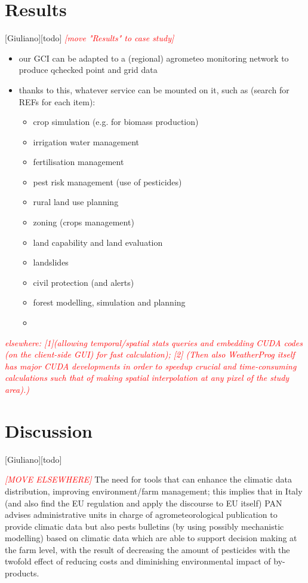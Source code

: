 \documentclass[authoryear,preprint,review,12pt]{elsarticle}
\newcommand{\note}[1]{\emph{\textcolor{red}{#1}}}
\begin{document}
\section{Results}[Giuliano][todo]
\note{[move "Results" to case study]}
\begin{itemize}
    \item our GCI can be adapted to a (regional) agrometeo monitoring network to produce qchecked point and grid data
    \item thanks to this, whatever service can be mounted on it, such as (search for REFs for each item):
    \begin{itemize}
        \item crop simulation (e.g. for biomass production)
        \item irrigation water management
        \item fertilisation management
        \item pest risk management (use of pesticides)
        \item rural land use planning
        \item zoning (crops management)
        \item land capability and land evaluation
        \item landslides
        \item civil protection (and alerts)
        \item forest modelling, simulation and planning
        \item 
    \end{itemize}
\end{itemize}

\note{ elsewhere: [1](allowing temporal/spatial stats queries and embedding CUDA codes (on the client-side GUI) for fast calculation); [2] (Then also WeatherProg itself has major CUDA developments in order to speedup crucial and time-consuming calculations such that of making spatial interpolation at any pixel of the study area).) }

\section{Discussion}[Giuliano][todo]

\note{[MOVE ELSEWHERE]} The need for tools that can enhance the climatic data distribution, improving environment/farm management; this implies that in Italy (and also find the EU regulation and apply the discourse to EU itself) PAN advises administrative units in charge of agrometeorological publication to provide climatic data but also pests bulletins (by using possibly mechanistic modelling) based on climatic data which are able to support decision making at the farm level, with the result of decreasing the amount of pesticides with the twofold effect of reducing costs and diminishing environmental impact of by-products.
\end{document}

